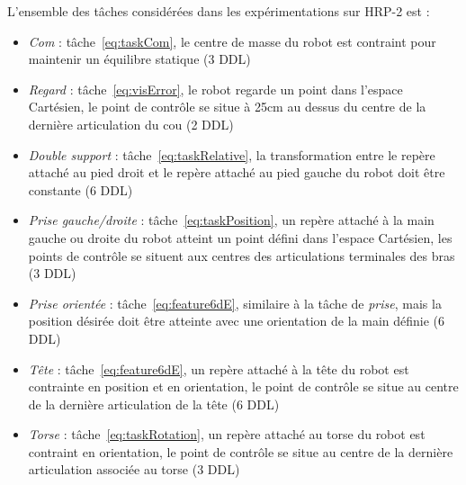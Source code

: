 L'ensemble des t\^aches considérées dans les expérimentations sur HRP-2 est : 

\begin{itemize}
  \item \emph{Com} : t\^ache~\eqref{eq:taskCom}, le centre de masse du robot est contraint pour maintenir un équilibre statique (3 DDL)
  \item \emph{Regard} : t\^ache~\eqref{eq:visError}, le robot regarde un point dans l'espace Cartésien, le point de contrôle se situe
à 25cm au dessus du centre de la dernière articulation du cou (2 DDL)
  \item \emph{Double support} : t\^ache~\eqref{eq:taskRelative}, la transformation entre le repère attaché au pied droit et le repère 
  attaché au pied gauche du robot doit être constante (6 DDL)
  \item \emph{Prise gauche/droite} : t\^ache~\eqref{eq:taskPosition}, un repère attaché à la main gauche ou droite du robot atteint un point défini dans l'espace Cartésien, les points de contrôle se situent aux centres des articulations terminales des bras (3 DDL)
  \item \emph{Prise orientée} : t\^ache~\eqref{eq:feature6dE}, similaire à la t\^ache de \emph{prise}, mais la position
    désirée doit \^etre atteinte avec une orientation de la main définie (6 DDL)
  \item \emph{Tête} : t\^ache~\eqref{eq:feature6dE}, un repère attaché à la t\^ete du robot est contrainte en position et en orientation, le point de contrôle se situe au centre de la dernière articulation de la tête (6 DDL) 
  \item \emph{Torse} : t\^ache~\eqref{eq:taskRotation}, un repère attaché au torse du robot est contraint en orientation, le point de contrôle se situe au centre de la dernière articulation associée au torse (3 DDL)
\end{itemize}
